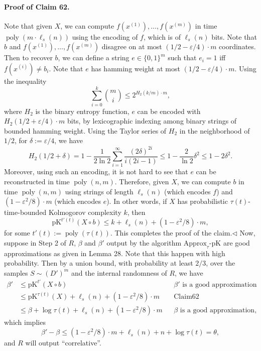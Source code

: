 \paragraph{Proof of Claim 62.} Note that given $X$, we can compute $f(x^{(1)}),\ldots,f(x^{(m)})$ in time $\operatorname{poly}(m\cdot\ell_s(n))$ using the encoding of $f$, which is of $\ell_s(n)$ bits. Note that $b$ and $f(x^{(1)}),\ldots,f(x^{(m)})$ disagree on at most $(1/2-\varepsilon/4)\cdot m$ coordinates. Then to recover $b$, we can define a string $e\in\{0,1\}^m$ such that $e_i=1$ iff $f(x^{(i)})\neq b_i$. Note that $e$ has hamming weight at most $(1/2-\varepsilon/4)\cdot m$. Using the inequality
\[\sum_{i=0}^k\binom mi\leq2^{H_2(k/m)\cdot m},\]
where $H_2$ is the binary entropy function, $e$ can be encoded with $H_2(1/2+\varepsilon/4)\cdot m$ bits, by lexicographic indexing among binary strings of bounded hamming weight. Using the Taylor series of $H_2$ in the neighborhood of $1/2$, for $\delta:=\varepsilon/4$, we have
\[H_2(1/2+\delta)=1-\frac1{2\ln2}\sum_{i=1}^\infty\frac{(2\delta)^{2i}}{i(2i-1)}\leq1-\frac2{\ln2}\delta^2\leq1-2\delta^2.\]
Moreover, using such an encoding, it is not hard to see that $e$ can be reconstructed in time $\operatorname{poly}(n,m)$. Therefore, given $X$, we can compute $b$ in time $\operatorname{poly}(n,m)$ using strings of length $\ell_s(n)$ (which encodes $f$) and $(1-\varepsilon^2/8)\cdot m$ (which encodes $e$). In other words, if $X$ has probabilistic $\tau(t)$-time-bounded Kolmogorov complexity $k$, then
\[\mathrm{pK}^{t'(t)}(X\circ b)\leq k+\ell_s(n)+(1-\varepsilon^2/8)\cdot m,\]
for some $t'(t):=\operatorname{poly}(\tau(t))$. This completes the proof of the claim.\hfill$\triangleleft$
Now, suppose in Step 2 of $R$, $\beta$ and $\beta'$ output by the algorithm $\mathrm{Approx}_\tau\text{-}\mathrm{pK}$ are good approximations as given in Lemma 28. Note that this happen with high probability. Then by a union bound, with probability at least $2/3$, over the samples $S\sim(D')^m$ and the internal randomness of $R$, we have
\begin{align*}
\beta'&\leq\mathrm{pK}^{t'}(X\circ b)&&\beta'\text{ is a good approximation}\\
&\leq\mathrm{pK}^{\tau(t)}(X)+\ell_s(n)+(1-\varepsilon^2/8)\cdot m&&\text{Claim62}\\
&\leq\beta+\log\tau(t)+\ell_s(n)+(1-\varepsilon^2/8)\cdot m&&\beta\text{ is a good approximation},
\end{align*}
which implies
\[\beta'-\beta\leq(1-\varepsilon^2/8)\cdot m+\ell_s(n)+n+\log\tau(t)=\theta,\]
and $R$ will output ``correlative''.
